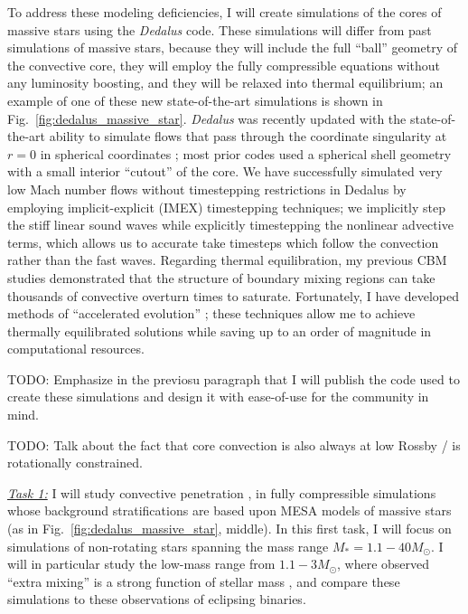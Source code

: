 \documentclass[12pt]{article}
\begin{document}
To address these modeling deficiencies, I will create simulations of the cores of massive stars using the \emph{Dedalus} \citep{burns_etal_2020} code.
These simulations will differ from past simulations of massive stars, because they will include the full ``ball'' geometry of the convective core, they will employ the fully compressible equations without any luminosity boosting, and they will be relaxed into thermal equilibrium; an example of one of these new state-of-the-art simulations is shown in Fig.~\ref{fig:dedalus_massive_star}.
\emph{Dedalus} was recently updated with the state-of-the-art ability to simulate flows that pass through the coordinate singularity at $r = 0$ in spherical coordinates \citep{vasil_etal_2019,lecoanet_etal_2019}; most prior codes used a spherical shell geometry with a small interior ``cutout'' of the core.
We have successfully simulated very low Mach number flows without timestepping restrictions in Dedalus by employing implicit-explicit (IMEX) timestepping techniques; we implicitly step the stiff linear sound waves while explicitly timestepping the nonlinear advective terms, which allows us to accurate take timesteps which follow the convection rather than the fast waves.
Regarding thermal equilibration, my previous CBM studies \citep{anders_etal_2022a,anders_etal_2022b} demonstrated that the structure of boundary mixing regions can take thousands of convective overturn times to saturate.
Fortunately, I have developed methods of ``accelerated evolution'' \citep{anders_etal_2018}; these techniques allow me to achieve thermally equilibrated solutions while saving up to an order of magnitude in computational resources.

TODO: Emphasize in the previosu paragraph that I will publish the code used to create these simulations and design it with ease-of-use for the community in mind.

TODO: Talk about the fact that core convection is also always at low Rossby / is rotationally constrained.

\emph{\underline{Task 1:}} %
I will study convective penetration \citep[Fig \ref{fig:penconv}, left,][]{anders_etal_2022a}, in fully compressible simulations whose background stratifications are based upon MESA models of massive stars (as in Fig.~\ref{fig:dedalus_massive_star}, middle).
In this first task, I will focus on simulations of non-rotating stars spanning the mass range $M_* = 1.1-40 M_{\odot}$.
I will in particular study the low-mass range from $1.1-3 M_{\odot}$, where observed ``extra mixing'' is a strong function of stellar mass \citep[][Fig.~\ref{fig:claret_torres} and Fig.~\ref{fig:penconv_stars}]{claret_torres_2019}, and compare these simulations to these observations of eclipsing binaries.
\end{document}
